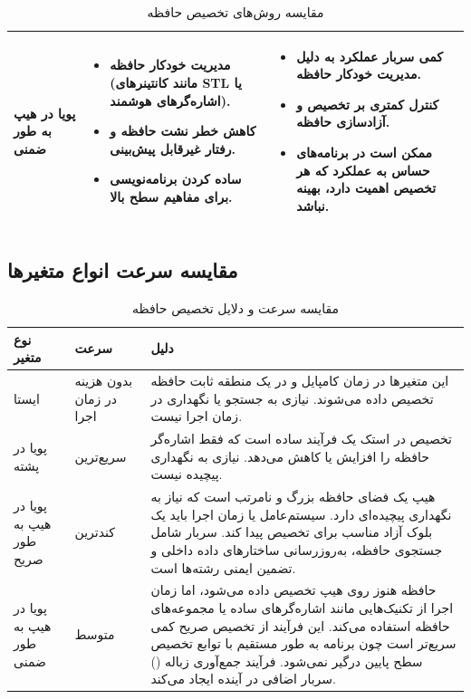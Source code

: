\documentclass[12pt, a4paper]{report}
\begin{document}
\begin{table}[h!]
\begin{tabular}{|p{4cm}|p{6cm}|p{6cm}|}
		\hline
		پویا در هیپ به طور ضمنی &
		\begin{itemize}
			\item مدیریت خودکار حافظه (مانند کانتینرهای STL یا اشاره‌گرهای هوشمند).
			\item کاهش خطر نشت حافظه و رفتار غیرقابل پیش‌بینی.
			\item ساده کردن برنامه‌نویسی برای مفاهیم سطح بالا.
		\end{itemize} &
		\begin{itemize}
			\item کمی سربار عملکرد به دلیل مدیریت خودکار حافظه.
			\item کنترل کمتری بر تخصیص و آزادسازی حافظه.
			\item ممکن است در برنامه‌های حساس به عملکرد که هر تخصیص اهمیت دارد، بهینه نباشد.
		\end{itemize} \\
		\hline
	\end{tabular}
	\caption{مقایسه روش‌های تخصیص حافظه}
	\label{tab:memory_allocation}
\end{table}

\subsection{مقایسه سرعت انواع متغیرها}
\begin{table}[H]
	\centering
	\begin{tabular}{|p{4cm}|p{3cm}|p{7cm}|}
		\hline
		\textbf{نوع متغیر} & \textbf{سرعت} & \textbf{دلیل} \\
		\hline
		ایستا &
		بدون هزینه در زمان اجرا &
		این متغیرها در زمان کامپایل و در یک منطقه ثابت حافظه تخصیص داده می‌شوند. نیازی به جستجو یا نگهداری در زمان اجرا نیست. \\
		\hline
		پویا در پشته &
		سریع‌ترین &
		تخصیص در استک یک فرآیند ساده است که فقط اشاره‌گر حافظه را افزایش یا کاهش می‌دهد. نیازی به نگهداری پیچیده نیست. \\
		\hline
		پویا در هیپ به طور صریح &
		کندترین &
		هیپ یک فضای حافظه بزرگ و نامرتب است که نیاز به نگهداری پیچیده‌ای دارد. سیستم‌عامل یا زمان اجرا باید یک بلوک آزاد مناسب برای تخصیص پیدا کند. سربار شامل جستجوی حافظه، به‌روزرسانی ساختارهای داده داخلی و تضمین ایمنی رشته‌ها است. \\
		\hline
		پویا در هیپ به طور ضمنی &
		متوسط &
		حافظه هنوز روی هیپ تخصیص داده می‌شود، اما زمان اجرا از تکنیک‌هایی مانند اشاره‌گرهای ساده یا مجموعه‌های حافظه استفاده می‌کند. این فرآیند از تخصیص صریح کمی سریع‌تر است چون برنامه به طور مستقیم با توابع تخصیص سطح پایین درگیر نمی‌شود. فرآیند جمع‌آوری زباله (\lr{garbage collection}) سربار اضافی در آینده ایجاد می‌کند. \\
		\hline
	\end{tabular}
	\caption{مقایسه سرعت و دلایل تخصیص حافظه}
	\label{tab:memory_speed}
\end{table}
\pagebreak
\end{document}
